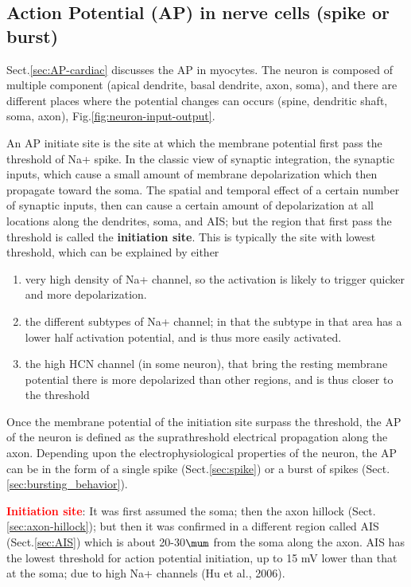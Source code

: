 \subsection{Action Potential (AP) in nerve cells (spike or burst)}
\label{sec:AP-neuron}

Sect.\ref{sec:AP-cardiac} discusses the AP in myocytes.
The neuron is composed of multiple component (apical dendrite, basal dendrite,
axon, soma), and there are different places where the potential changes can
occurs (spine, dendritic shaft, soma, axon), Fig.\ref{fig:neuron-input-output}.

An AP initiate site is the site at which the membrane potential first pass the
threshold of Na+ spike. In the classic view of synaptic integration, the
synaptic inputs, which cause a small amount of membrane depolarization which
then propagate toward the soma. The spatial and temporal effect of a certain
number of synaptic inputs, then can cause a certain amount of depolarization at
all locations along the dendrites, soma, and AIS; but the region that first pass
the threshold is called the {\bf initiation site}. This is typically the site
with lowest threshold, which can be explained by either
\begin{enumerate}
  \item very high density of Na+ channel, so the activation is likely to trigger
  quicker and more depolarization.
  
  \item the different subtypes of Na+ channel; in that the subtype in that area
  has a lower half activation potential, and is thus more easily activated.
  
  \item the high HCN channel (in some neuron), that bring the resting membrane
  potential there is more depolarized than other regions, and is thus closer to
  the threshold
\end{enumerate}

Once the membrane potential of the initiation site surpass the threshold, the AP
of the neuron is defined as the suprathreshold electrical propagation along the
axon. Depending upon the electrophysiological properties of the neuron, the AP
can be in the form of a single spike (Sect.\ref{sec:spike}) or a burst of spikes
(Sect.\ref{sec:bursting_behavior}).

\textcolor{red}{\bf Initiation site}:
It was first assumed the soma; then the axon hillock
(Sect.\ref{sec:axon-hillock}); but then it was confirmed in a different region
called AIS (Sect.\ref{sec:AIS}) which is about 20-30$\mum$ from the soma along
the axon. AIS has the lowest threshold for action potential initiation, up
to  15  mV  lower  than  that  at  the  soma; due to high Na+ channels (Hu et
al., 2006).

